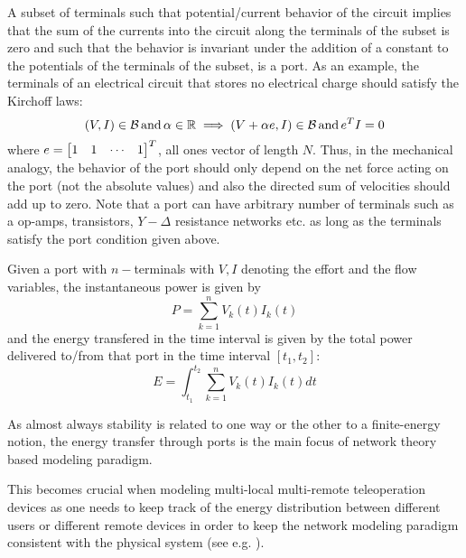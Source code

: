 A subset of terminals such that potential/current behavior of the circuit implies that the sum of the currents into the 
circuit along the terminals of the subset is zero and such that the behavior is invariant under the addition of a constant 
to the potentials of the terminals of the subset, is a port. As an example, the terminals of an electrical circuit that stores no electrical 
charge should satisfy the Kirchoff laws: 
\[
(V,I) \in \mathcal{B}\,\text{and}\, \alpha\in\mathbb{R} \implies (V+\alpha e,I) \in \mathcal{B}\,\text{and}\, e^T I = 0
\]
where $e=\begin{bmatrix}1&1&\cdots&1\end{bmatrix}^T$, all ones vector of length $N$. Thus, in the mechanical analogy, the behavior of the 
port should only depend on the net force acting on the port (not the absolute values) and also the directed sum of 
velocities should add up to zero. Note that a port can have arbitrary number of terminals such as a op-amps, transistors, 
$Y-\Delta$ resistance networks etc. as long as the terminals satisfy the port condition given above. 

Given a port with $n-$terminals with $V,I$ denoting the effort and the flow variables, the instantaneous power is given by 
\[
P = \sum_{k=1}^n{V_k(t)I_k(t)}
\]
and the energy transfered in the time interval is given by the total power delivered
to/from that port in the time interval $[t_1,t_2]$: 
\[
E = \int^{t_{2}}_{t_{1}}\sum_{k=1}^n{V_k(t)I_k(t)}dt
\]

As almost always stability is related to one way or the other to a finite-energy notion, the energy transfer through ports
is the main focus of network theory based modeling paradigm.

This becomes crucial when modeling multi-local multi-remote teleoperation devices
as one needs to keep track of the energy distribution between different users or different remote devices in order to 
keep the network modeling paradigm consistent with the physical system (see e.g. \cite{panzirsch}).
%
%


